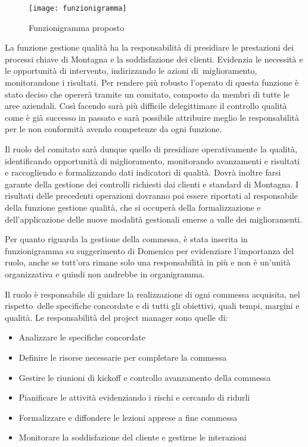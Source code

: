 \begin{figure}[H]
	\centering
	\texttt{[image: funzionigramma]}
	\caption{Funzionigramma proposto}
\end{figure}

\begin{multicols}{2}
	La funzione gestione qualità ha la responsabilità di presidiare le prestazioni dei processi chiave di Montagna e la soddisfazione dei clienti. Evidenzia le necessità e le opportunità di intervento, indirizzando le azioni di miglioramento, monitorandone i risultati. Per rendere più robusto l’operato di questa funzione è stato deciso che opererà tramite un comitato, composto da membri di tutte le aree aziendali. Così facendo sarà più difficile delegittimare il controllo qualità come è già successo in passato e sarà possibile attribuire meglio le responsabilità per le non conformità avendo competenze da ogni funzione.

	Il ruolo del comitato sarà dunque quello di presidiare operativamente la qualità, identificando opportunità di miglioramento, monitorando avanzamenti e risultati e raccogliendo e formalizzando dati indicatori di qualità. Dovrà inoltre farsi garante della gestione dei controlli richiesti dai clienti e standard di Montagna. I risultati delle precedenti operazioni dovranno poi essere riportati al responsabile della funzione gestione qualità, che si occuperà della formalizzazione e dell’applicazione delle nuove modalità gestionali emerse a valle dei miglioramenti.

	Per quanto riguarda la gestione della commessa, è stata inserita in funzionigramma su suggerimento di Domenico per evidenziare l’importanza del ruolo, anche se tutt’ora rimane solo una responsabilità in più e non è un’unità organizzativa e quindi non andrebbe in organigramma.

	Il ruolo è responsabile di guidare la realizzazione di ogni commessa acquisita, nel rispetto delle specifiche concordate e di tutti gli obiettivi, quali tempi, margini e qualità. Le responsabilità del project manager sono quelle di:
	\begin{itemize}
		\item Analizzare le specifiche concordate
		\item Definire le risorse necessarie per completare la commessa
		\item Gestire le riunioni di kickoff e controllo avanzamento della commessa
		\item Pianificare le attività evidenziando i rischi e cercando di ridurli
		\item Formalizzare e diffondere le lezioni apprese a fine commessa
		\item Monitorare la soddisfazione del cliente e gestirne le interazioni
	\end{itemize}


\end{multicols}
